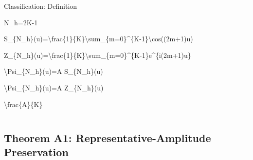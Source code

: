 \documentclass[
  a4paper]{article}
\newenvironment{Shaded}{}{}
\newcommand{\NormalTok}[1]{#1}
\begin{document}
Classification: Definition

\begin{Shaded}
\begin{Highlighting}[]
\NormalTok{N\_h=2K{-}1}
\end{Highlighting}
\end{Shaded}

\begin{Shaded}
\begin{Highlighting}[]
\NormalTok{S\_\{N\_h\}(u)=\textbackslash{}frac\{1\}\{K\}\textbackslash{}sum\_\{m=0\}\^{}\{K{-}1\}\textbackslash{}cos((2m+1)u)}
\end{Highlighting}
\end{Shaded}

\begin{Shaded}
\begin{Highlighting}[]
\NormalTok{Z\_\{N\_h\}(u)=\textbackslash{}frac\{1\}\{K\}\textbackslash{}sum\_\{m=0\}\^{}\{K{-}1\}e\^{}\{i(2m+1)u\}}
\end{Highlighting}
\end{Shaded}

\begin{Shaded}
\begin{Highlighting}[]
\NormalTok{\textbackslash{}Psi\_\{N\_h\}(u)=A S\_\{N\_h\}(u)}
\end{Highlighting}
\end{Shaded}

\begin{Shaded}
\begin{Highlighting}[]
\NormalTok{\textbackslash{}Psi\_\{N\_h\}(u)=A Z\_\{N\_h\}(u)}
\end{Highlighting}
\end{Shaded}

\begin{Shaded}
\begin{Highlighting}[]
\NormalTok{\textbackslash{}frac\{A\}\{K\}}
\end{Highlighting}
\end{Shaded}

\begin{center}\rule{0.5\linewidth}{0.5pt}\end{center}

\subsection{Theorem A1: Representative-Amplitude
Preservation}\label{theorem-a1-representative-amplitude-preservation}
\end{document}
